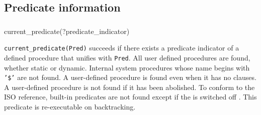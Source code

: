 \subsection{Predicate information}

\subsubsection{\label{current-predicate/1}}

\begin{TemplatesOneCol}
current\_predicate(?predicate\_indicator)

\end{TemplatesOneCol}

\Description

\texttt{current\_predicate(Pred)} succeeds if there
exists a predicate indicator of a defined procedure that unifies with
\texttt{Pred}. All user defined procedures are found, whether static or
dynamic. Internal system procedures whose name begins
with \texttt{'\$'} are not found. A user-defined procedure is found
even when it has no clauses. A user-defined procedure is not found if
it has been abolished. To conform to the ISO reference, built-in predicates
are not found except if the   is switched off . This predicate is re-executable on
backtracking.

\begin{PlErrors}






\end{PlErrors}

